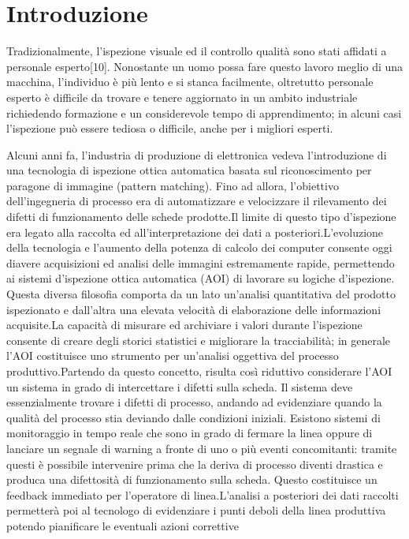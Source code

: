 \chapter{Introduzione}

Tradizionalmente, l'ispezione visuale ed il controllo qualità sono stati
affidati a personale esperto[10].
Nonostante un uomo possa fare questo lavoro meglio di una macchina,
l'individuo è più lento e si stanca facilmente, oltretutto personale esperto è
difficile da trovare e tenere aggiornato in un ambito industriale richiedendo
formazione e un considerevole tempo di apprendimento; in alcuni casi
l'ispezione può essere tediosa o difficile, anche per i migliori esperti.

Alcuni anni fa, l’industria di produzione di elettronica vedeva l’introduzione
di una tecnologia di ispezione ottica automatica basata sul riconoscimento per
paragone di immagine (pattern matching). Fino ad allora, l’obiettivo
dell’ingegneria di processo era di automatizzare e velocizzare il rilevamento
dei difetti di funzionamento delle schede prodotte.Il limite di questo tipo
d’ispezione era legato alla raccolta ed all’interpretazione dei dati a
posteriori.L’evoluzione della tecnologia e l’aumento della potenza di calcolo
dei computer consente oggi diavere acquisizioni ed analisi delle immagini
estremamente rapide, permettendo ai sistemi d’ispezione ottica automatica
(AOI) di lavorare su logiche d’ispezione. Questa diversa filosofia  comporta
da un lato un’analisi quantitativa del prodotto ispezionato e dall’altra una
elevata velocità di elaborazione delle informazioni acquisite.La capacità di
misurare ed archiviare i valori durante l’ispezione consente di creare degli
storici statistici e migliorare la tracciabilità; in generale l’AOI
costituisce uno strumento per un’analisi oggettiva del processo
produttivo.Partendo da questo concetto, risulta così riduttivo considerare
l’AOI un sistema in grado di intercettare i difetti sulla scheda. Il sistema
deve essenzialmente trovare i difetti di processo, andando ad evidenziare
quando la qualità del processo stia deviando dalle condizioni iniziali.
Esistono sistemi di monitoraggio in tempo reale che sono in grado di fermare
la linea oppure di lanciare un segnale di warning a fronte di uno o più eventi
concomitanti: tramite questi è possibile intervenire prima che la deriva di
processo diventi drastica e produca una difettosità di funzionamento sulla
scheda. Questo costituisce un feedback immediato per l’operatore di
linea.L’analisi a posteriori dei dati raccolti permetterà poi al tecnologo di
evidenziare i punti deboli della linea produttiva potendo pianificare le
eventuali azioni correttive

